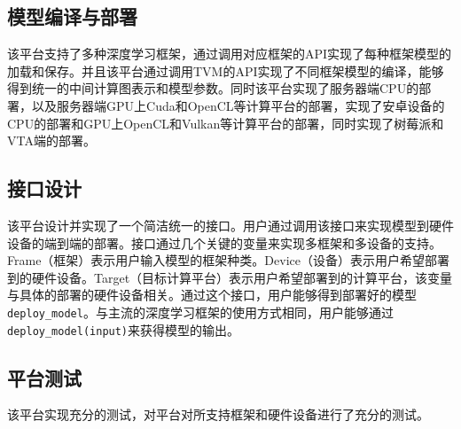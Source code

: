 \subsection{模型编译与部署}

该平台支持了多种深度学习框架，通过调用对应框架的API实现了每种框架模型的加载和保存。并且该平台通过调用TVM的API实现了不同框架模型的编译，能够得到统一的中间计算图表示和模型参数。同时该平台实现了服务器端CPU的部署，以及服务器端GPU上Cuda和OpenCL等计算平台的部署，实现了安卓设备的CPU的部署和GPU上OpenCL和Vulkan等计算平台的部署，同时实现了树莓派和VTA端的部署。

\subsection{接口设计}

该平台设计并实现了一个简洁统一的接口。用户通过调用该接口来实现模型到硬件设备的端到端的部署。接口通过几个关键的变量来实现多框架和多设备的支持。Frame（框架）表示用户输入模型的框架种类。Device（设备）表示用户希望部署到的硬件设备。Target（目标计算平台）表示用户希望部署到的计算平台，该变量与具体的部署的硬件设备相关。通过这个接口，用户能够得到部署好的模型\verb|deploy_model|。与主流的深度学习框架的使用方式相同，用户能够通过\verb|deploy_model(input)|来获得模型的输出。

\subsection{平台测试}

该平台实现充分的测试，对平台对所支持框架和硬件设备进行了充分的测试。


